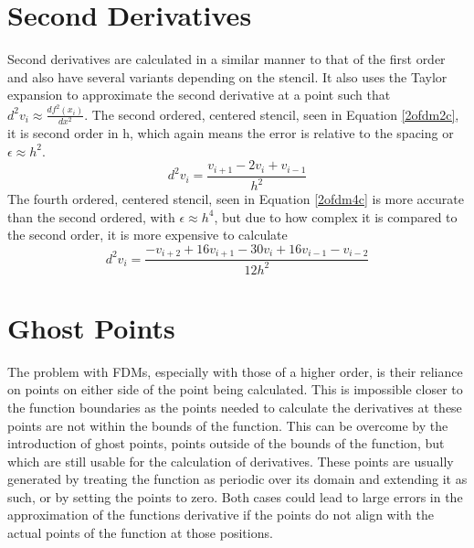 \section{Second Derivatives}
Second derivatives are calculated in a similar manner to that of the first order and also have several variants depending on the stencil. It also uses the Taylor expansion to approximate the second derivative at a point such that $d^2v_i \approx \frac{df^2(x_i)}{dx^2}$.
\linebreak
\linebreak
The second ordered, centered stencil, seen in Equation \ref{2ofdm2c}, it is second order in h, which again means the error is relative to the spacing or $\epsilon \approx h^2$.
\begin{equation} \label{2ofdm2c}
  d^2v_i = \frac{v_{i+1} - 2v_i + v_{i-1}}{h^2}
\end{equation}
The fourth ordered, centered stencil, seen in Equation \ref{2ofdm4c} is more accurate than the second ordered, with $\epsilon \approx h^4$, but due to how complex it is compared to the second order, it is more expensive to calculate
\begin{equation} \label{2ofdm4c}
  d^2v_i = \frac{-v_{i+2} + 16v_{i+1} - 30v_i + 16v_{i-1} - v_{i-2}}{12h^2}
\end{equation}
\section{Ghost Points}
The problem with FDMs, especially with those of a higher order, is their reliance on points on either side of the point being calculated. This is impossible closer to the function boundaries as the points needed to calculate the derivatives at these points are not within the bounds of the function. This can be overcome by the introduction of ghost points, points outside of the bounds of the function, but which are still usable for the calculation of derivatives. These points are usually generated by treating the function as periodic over its domain and extending it as such, or by setting the points to zero. Both cases could lead to large errors in the approximation of the functions derivative if the points do not align with the actual points of the function at those positions.